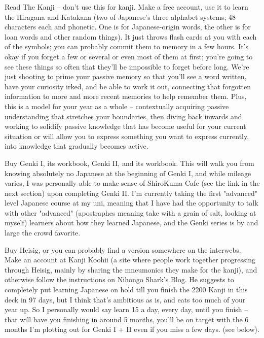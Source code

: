 Read The Kanji -- don't use this for kanji.
Make a free account, use it to learn the Hiragana and Katakana (two of Japanese's three alphabet systems; 48 characters each and phonetic. One is for Japanese-origin words, the other is for loan words and other random things). It just throws flash cards at you with each of the symbols; you can probably commit them to memory in a few hours. It's okay if you forget a few or several or even most of them at first; you're going to see these things so often that they'll be impossible to forget before long. We're just shooting to prime your passive memory so that you'll see a word written, have your curiosity irked, and be able to work it out, connecting that forgotten information to more and more recent memories to help remember them. Plus, this is a model for your year as a whole -- contextually acquiring passive understanding that stretches your boundaries, then diving back inwards and working to solidify passive knowledge that has become useful for your current situation or will allow you to express something you want to express currently, into knowledge that gradually becomes active.

Buy Genki I, its workbook, Genki II, and its workbook.
This will walk you from knowing absolutely no Japanese at the beginning of Genki I, and while mileage varies, I was personally able to make sense of ShiroKuma Cafe (see the link in the next section) upon completing Genki II. I'm currently taking the first "advanced" level Japanese course at my uni, meaning that I have had the opportunity to talk with other "advanced" (apostraphes meaning take with a grain of salt, looking at myself) learners about how they learned Japanese, and the Genki series is by and large the crowd favorite.

Buy Heisig, or you can probably find a version somewhere on the interwebs. 
Make an account at Kanji Koohii (a site where people work together progressing through Heisig, mainly by sharing the mneumonics they make for the kanji), and otherwise follow the instructions on Nihongo Shark's Blog. He suggests to completely put learning Japanese on hold till you finish the 2200 Kanji in this deck in 97 days, but I think that's ambitious as is, and eats too much of your year up. So I personally would say learn 15 a day, every day, until you finish -- that will have you finishing in around 5 months, you'll be on target with the 6 months I'm plotting out for Genki I + II even if you miss a few days. (see below).

